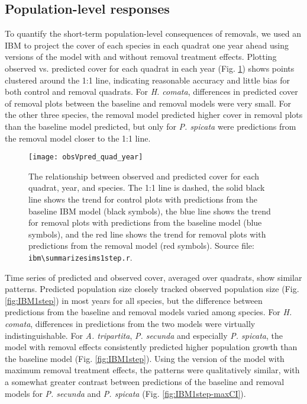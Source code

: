 \documentclass[11pt]{article}
\begin{document}
\begin{doublespacing}
\subsection*{Population-level responses}

To quantify the short-term population-level consequences of removals, we used an IBM to project the cover of each species in each quadrat one year ahead using versions of the model with and without removal treatment effects. Plotting observed vs. predicted cover for each quadrat in each year (Fig. \ref{fig:obsVpred}) shows points clustered around the 1:1 line, indicating reasonable accuracy and little bias for both control and removal quadrats. For \textit{H. comata}, differences in predicted cover of removal plots between the baseline and removal models were very small. For the other three species, the removal model predicted higher cover in removal plots than the baseline model predicted, but only for \textit{P. spicata} were predictions from the removal model closer to the 1:1 line.

 \begin{figure}[tbp]
 \centering
 \texttt{[image: obsVpred\_quad\_year]}
 \caption{The relationship between observed and predicted cover for each quadrat, year, and species. The 1:1 line is dashed, the solid black line shows the trend for control plots with predictions from the baseline IBM model (black symbols), the blue line shows the trend for removal plots with predictions from the baseline model (blue symbols), and the red line shows the trend for removal plots with predictions from the removal model (red symbols). Source file: \texttt{ibm\textbackslash summarize\textunderscore sims1step.r}. }
 \label{fig:obsVpred}
 \end{figure}
 
Time series of predicted and observed cover, averaged over quadrats, show similar patterns. Predicted population size closely tracked observed population size (Fig. \ref{fig:IBM1step}) in most years for all species, but the difference between predictions from the baseline and removal models varied among species. For \textit{H. comata}, differences in predictions from the two models were virtually indistinguishable. For \textit{A. tripartita}, \textit{P. secunda} and especially \textit{P. spicata}, the model with removal effects consistently predicted higher population growth than the baseline model (Fig. \ref{fig:IBM1step}). Using the version of the model with maximum removal treatment effects, the patterns were qualitatively similar, with a somewhat greater contrast between predictions of the baseline and removal models for \textit{P. secunda} and \textit{P. spicata} (Fig. \ref{fig:IBM1step-maxCI}). 


\end{doublespacing}
\end{document}
